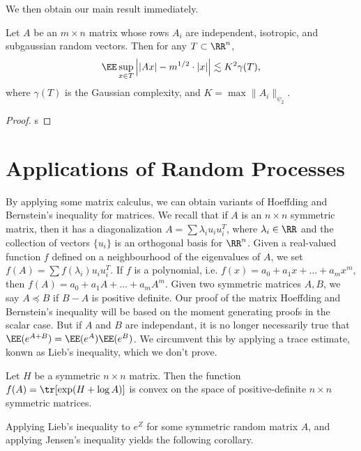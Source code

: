 We then obtain our main result immediately.

\begin{theorem}
	Let $A$ be an $m \times n$ matrix whose rows $A_i$ are independent, isotropic, and subgaussian random vectors. Then for any $T \subset \RR^n$,
	\[ \EE \sup_{x \in T} \left| |Ax| - m^{1/2} \cdot |x| \right| \lesssim K^2 \gamma(T), \]
	where $\gamma(T)$ is the Gaussian complexity, and $K = \max \| A_i \|_{\psi_2}$.
\end{theorem}
\begin{proof}
	s
\end{proof}










\chapter{Applications of Random Processes}

By applying some matrix calculus, we can obtain variants of Hoeffding and Bernstein's inequality for matrices. We recall that if $A$ is an $n \times n$ symmetric matrix, then it has a diagonalization $A = \sum \lambda_i u_i u_i^T$, where $\lambda_i \in \RR$ and the collection of vectors $\{ u_i \}$ is an orthogonal basis for $\RR^n$. Given a real-valued function $f$ defined on a neighbourhood of the eigenvalues of $A$, we set $f(A) = \sum f(\lambda_i) u_i u_i^T$. If $f$ is a polynomial, i.e. $f(x) = a_0 + a_1x + \dots + a_m x^m$, then $f(A) = a_0 + a_1A + \dots + a_m A^m$. Given two symmetric matrices $A,B$, we say $A \preceq B$ if $B - A$ is positive definite. Our proof of the matrix Hoeffding and Bernstein's inequality will be based on the moment generating proofs in the scalar case. But if $A$ and $B$ are independant, it is no longer necessarily true that $\EE(e^{A+B}) = \EE(e^A) \EE(e^B)$. We circumvent this by applying a trace estimate, konwn as Lieb's inequality, which we don't prove.

\begin{theorem}
    Let $H$ be a symmetric $n \times n$ matrix. Then the function $f(A) = \tr[\exp(H + \log A)]$ is convex on the space of positive-definite $n \times n$ symmetric matrices.
\end{theorem}

Applying Lieb's inequality to $e^Z$ for some symmetric random matrix $A$, and applying Jensen's inequality yields the following corollary.

